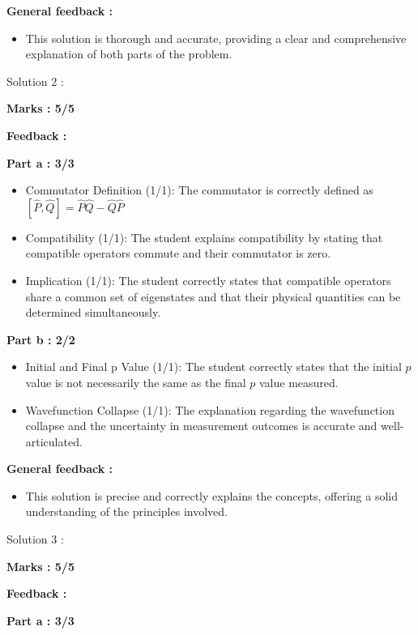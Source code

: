 \documentclass[a4paper,11pt]{article}
\begin{document}
\textbf{General feedback :}

\begin{itemize}
    \item This solution is thorough and accurate, providing a clear and comprehensive explanation of both parts of the problem.
\end{itemize}


Solution 2 :

\textbf{Marks : 5/5}

\textbf{Feedback :}

\textbf{Part a : 3/3}

\begin{itemize}
    \item Commutator Definition (1/1): The commutator is correctly defined as $[\hat{P},\hat{Q}] = \hat{P}\hat{Q} - \hat{Q}\hat{P}$
    \item Compatibility (1/1): The student explains compatibility by stating that compatible operators commute and their commutator is zero.
    \item Implication (1/1): The student correctly states that compatible operators share a common set of eigenstates and that their physical quantities can be determined simultaneously.
\end{itemize}

\textbf{Part b : 2/2}

\begin{itemize}
    \item Initial and Final p Value (1/1): The student correctly states that the initial $p$ value is not necessarily the same as the final $p$ value measured.
    \item Wavefunction Collapse (1/1): The explanation regarding the wavefunction collapse and the uncertainty in measurement outcomes is accurate and well-articulated.
\end{itemize}

\textbf{General feedback :}

\begin{itemize}
    \item This solution is precise and correctly explains the concepts, offering a solid understanding of the principles involved.
\end{itemize}


Solution 3 :

\textbf{Marks : 5/5}

\textbf{Feedback : }

\textbf{Part a : 3/3}
\end{document}
